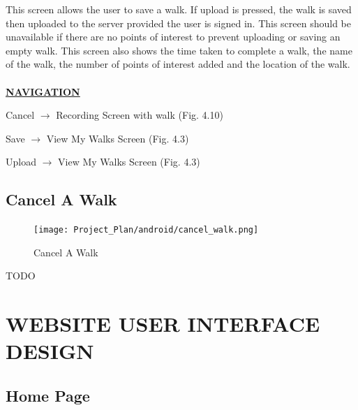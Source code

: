 \documentclass[12pt]{article}
\begin{document}
\par{This screen allows the user to save a walk. If upload is pressed, the walk is saved then uploaded to the server provided the user is signed in. This screen should be unavailable if there are no points of interest to prevent uploading or saving an empty walk. This screen also shows the time taken to complete a walk, the name of the walk, the number of points of interest added and the location of the walk. \\ \\}
\textbf{\uline{NAVIGATION}}
\par{Cancel $\rightarrow$ Recording Screen with walk (Fig. 4.10)}
\par{Save $\rightarrow$ View My Walks Screen (Fig. 4.3)}
\par{Upload $\rightarrow$ View My Walks Screen (Fig. 4.3)}
\subsection{Cancel A Walk}
\begin{figure}[htp]
\centering
\texttt{[image: Project\_Plan/android/cancel\_walk.png]}
\caption{Cancel A Walk}
\label{Cancel A Walk}
\end{figure}
TODO
\newpage
\section{WEBSITE USER INTERFACE DESIGN}
\subsection{Home Page}
\end{document}
